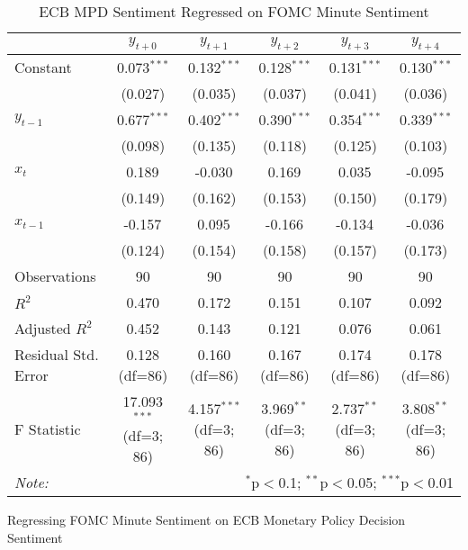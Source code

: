 \documentclass[12pt, letterpaper]{article}
\begin{document}
\begin{table}[H]
    \centering
    \caption{ECB MPD Sentiment Regressed on FOMC Minute Sentiment}
    \begin{adjustbox}{width=\textwidth}
    \begin{tabular}{lccccc}
    \hline
    \hline
     & \multicolumn{1}{c}{$y_{t+0}$} & \multicolumn{1}{c}{$y_{t+1}$} & \multicolumn{1}{c}{$y_{t+2}$} & \multicolumn{1}{c}{$y_{t+3}$} & \multicolumn{1}{c}{$y_{t+4}$}  \\
    \hline
     Constant & 0.073$^{***}$ & 0.132$^{***}$ & 0.128$^{***}$ & 0.131$^{***}$ & 0.130$^{***}$ \\
    & (0.027) & (0.035) & (0.037) & (0.041) & (0.036) \\
     $y_{t-1}$ & 0.677$^{***}$ & 0.402$^{***}$ & 0.390$^{***}$ & 0.354$^{***}$ & 0.339$^{***}$ \\
    & (0.098) & (0.135) & (0.118) & (0.125) & (0.103) \\
     $x_{t}$ & 0.189$^{}$ & -0.030$^{}$ & 0.169$^{}$ & 0.035$^{}$ & -0.095$^{}$ \\
    & (0.149) & (0.162) & (0.153) & (0.150) & (0.179) \\
     $x_{t-1}$ & -0.157$^{}$ & 0.095$^{}$ & -0.166$^{}$ & -0.134$^{}$ & -0.036$^{}$ \\
    & (0.124) & (0.154) & (0.158) & (0.157) & (0.173) \\
    \hline
     Observations & 90 & 90 & 90 & 90 & 90 \\
     $R^2$ & 0.470 & 0.172 & 0.151 & 0.107 & 0.092 \\
     Adjusted $R^2$ & 0.452 & 0.143 & 0.121 & 0.076 & 0.061 \\
     Residual Std. Error & 0.128 (df=86) & 0.160 (df=86) & 0.167 (df=86) & 0.174 (df=86) & 0.178 (df=86) \\
     F Statistic & 17.093$^{***}$ (df=3; 86) & 4.157$^{***}$ (df=3; 86) & 3.969$^{**}$ (df=3; 86) & 2.737$^{**}$ (df=3; 86) & 3.808$^{**}$ (df=3; 86) \\
    \hline
    \hline
    \textit{Note:} & \multicolumn{5}{r}{$^{*}$p$<$0.1; $^{**}$p$<$0.05; $^{***}$p$<$0.01} \\
    \end{tabular}
  \end{adjustbox}
\end{table}

Regressing FOMC Minute Sentiment on ECB Monetary Policy Decision Sentiment
\end{document}

